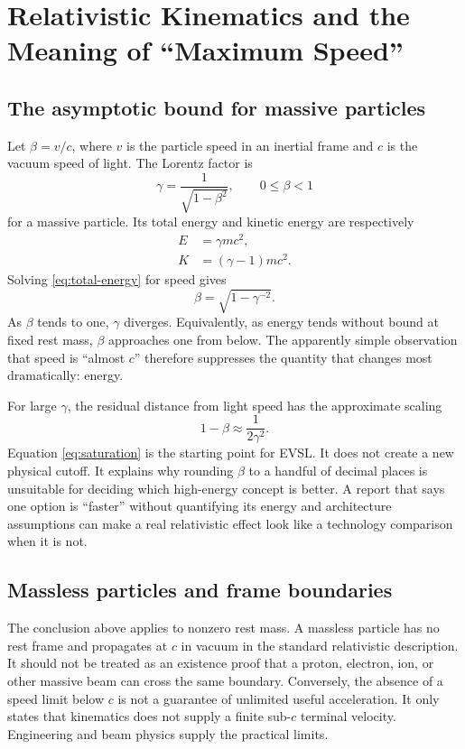 \documentclass[conference]{../../../../Conference-LaTeX-template_10-17-19/IEEEtran}
\begin{document}
\section{Relativistic Kinematics and the Meaning of ``Maximum Speed''}
\subsection{The asymptotic bound for massive particles}
Let $\beta=v/c$, where $v$ is the particle speed in an inertial frame and $c$ is the vacuum speed of light. The Lorentz factor is
\begin{equation}
\gamma=\frac{1}{\sqrt{1-\beta^2}}, \qquad 0\leq \beta<1
\label{eq:gamma}
\end{equation}
for a massive particle. Its total energy and kinetic energy are respectively
\begin{align}
E&=\gamma mc^2, \label{eq:total-energy}\\
K&=(\gamma-1)mc^2. \label{eq:kinetic-energy}
\end{align}
Solving \eqref{eq:total-energy} for speed gives
\begin{equation}
\beta=\sqrt{1-\gamma^{-2}}.
\label{eq:beta-energy}
\end{equation}
As $\beta$ tends to one, $\gamma$ diverges. Equivalently, as energy tends without bound at fixed rest mass, $\beta$ approaches one from below. The apparently simple observation that speed is ``almost $c$'' therefore suppresses the quantity that changes most dramatically: energy.

For large $\gamma$, the residual distance from light speed has the approximate scaling
\begin{equation}
1-\beta \approx \frac{1}{2\gamma^2}.
\label{eq:saturation}
\end{equation}
Equation \eqref{eq:saturation} is the starting point for EVSL. It does not create a new physical cutoff. It explains why rounding $\beta$ to a handful of decimal places is unsuitable for deciding which high-energy concept is better. A report that says one option is ``faster'' without quantifying its energy and architecture assumptions can make a real relativistic effect look like a technology comparison when it is not.

\subsection{Massless particles and frame boundaries}
The conclusion above applies to nonzero rest mass. A massless particle has no rest frame and propagates at $c$ in vacuum in the standard relativistic description. It should not be treated as an existence proof that a proton, electron, ion, or other massive beam can cross the same boundary. Conversely, the absence of a speed limit below $c$ is not a guarantee of unlimited useful acceleration. It only states that kinematics does not supply a finite sub-$c$ terminal velocity. Engineering and beam physics supply the practical limits.
\end{document}
